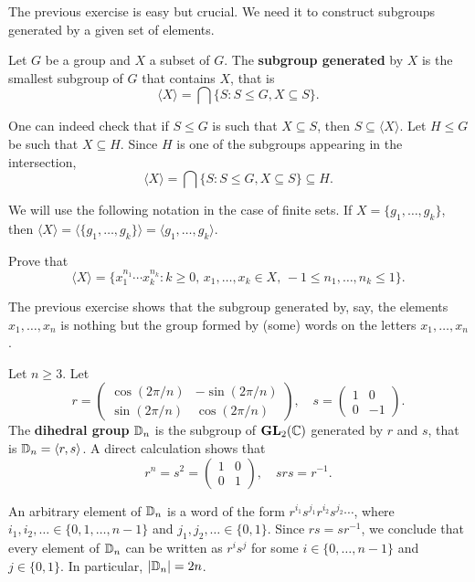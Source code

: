 The previous exercise is easy but crucial. We need it 
to construct subgroups generated 
by a given set of elements. 

\begin{definition}
        Let $G$ be a group and $X$ a subset of $G$. The \textbf{subgroup
        generated} by $X$ is the smallest subgroup of $G$ that contains
        $X$, that is 
        \[
            \langle X\rangle=\bigcap\{S:S\leq G,X\subseteq S\}.
        \]
\end{definition}

One can indeed check that if $S\leq G$ is such that $X\subseteq S$, then
$S\subseteq\langle X\rangle$. Let $H\leq G$ be such that 
$X\subseteq H$. Since $H$ is one of the subgroups appearing
in the intersection, 
\[
        \langle X\rangle=\bigcap\{S:S\leq G,X\subseteq S\}\subseteq H.        
\]

We will use the following notation in the case of finite sets. 
If $X=\{g_1,\dots,g_k\}$, then $\langle
X\rangle=\langle\{g_1,\dots,g_k\}\rangle=\langle g_1,\dots,g_k\rangle$.

\begin{exercise}
Prove that 
\[
        \langle X\rangle=\{x_1^{n_1}\cdots x_k^{n_k}:k\geq0,\,x_1,\dots,x_k\in X,\,-1\leq n_1,\dots,n_k\leq 1\}.
\]
\end{exercise}

The previous exercise shows that
the subgroup generated by, say, the elements 
$x_1,\dots,x_n$ is nothing but the 
group formed by (some) words on the letters 
$x_1,\dots,x_n$. 

\begin{example}
Let $n\geq3$. Let 
\[
r=\begin{pmatrix}
\cos(2\pi/n) & -\sin(2\pi/n)\\
\sin(2\pi/n) & \cos(2\pi/n)
\end{pmatrix},
\quad
s=\begin{pmatrix}
        1 & 0\\
        0 & -1
\end{pmatrix}.
\]
The \textbf{dihedral group} $\mathbb{D}_n$ is the subgroup of
$\mathbf{GL}_2(\mathbb{C})$ generated by $r$ and $s$,
that is $\mathbb{D}_n=\langle r,s\rangle$. A direct calculation shows that 
\[
r^n=s^2=\begin{pmatrix}
        1&0\\
        0&1
\end{pmatrix},
\quad
srs=r^{-1}.
\]

An arbitrary element of $\mathbb{D}_n$ is a word of the form 
$r^{i_1}s^{j_1}r^{i_2}s^{j_2}\cdots$, where
 $i_1,i_2,\dots\in\{0,1,\dots,n-1\}$ and 
$j_1,j_2,\dots\in\{0,1\}$. Since $rs=sr^{-1}$, we conclude that
every element of $\mathbb{D}_n$ can be written as $r^is^j$ 
for some $i\in\{0,\dots,n-1\}$ and $j\in\{0,1\}$. In particular, 
$|\mathbb{D}_n|=2n$.
\end{example}

